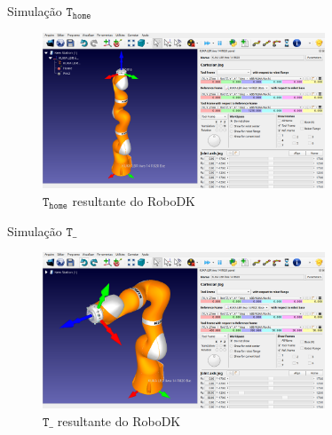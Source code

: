 \documentclass[aspectratio=169]{beamer}
\begin{document}
\begin{frame}{Simulação $\mathtt{T}_\mathtt{home}$}
\begin{figure}[h]
    \centering
    \includegraphics[width=0.75\textwidth]{Fig/home.png}
    \caption{$\mathtt{T}_\mathtt{home}$ resultante do RoboDK}
    \label{fig:Thome}
\end{figure}
\end{frame}
\begin{frame}{Simulação $\mathtt{T\_}$}
    \begin{figure}[h]
    \centering
    \includegraphics[width=0.75\textwidth]{Fig/escolhido.png}
    \caption{$\mathtt{T\_}$ resultante do RoboDK}
    \label{fig:Tescohido}
\end{figure}
\end{frame}
\end{document}
